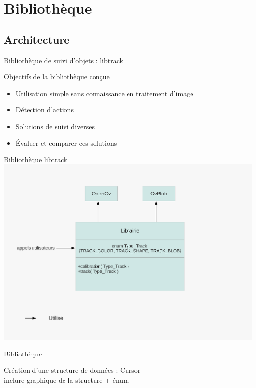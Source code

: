 \documentclass{beamer}
\begin{document}
      \section{Bibliothèque}
            \subsection{Architecture}
            \begin{frame}{Bibliothèque de suivi d'objets : libtrack}
                  \begin{block}{Objectifs de la bibliothèque conçue}
                        \begin{itemize}
                        	\item{Utilisation simple sans connaissance en traitement d'image}
                        	\item{Détection d'actions}
                        	\item{Solutions de suivi diverses}
                        	\item{Évaluer et comparer ces solutions}
                        \end{itemize}
                  \end{block}
            \end{frame}

            \begin{frame}{Bibliothèque libtrack}
                  \includegraphics[scale=0.40]{schema-librairie.pdf}
            \end{frame}

            \begin{frame}{Bibliothèque}

            Création d'une structure de données : Cursor\\
	inclure graphique de la structure + énum
            \end{frame}
            
\end{document}
